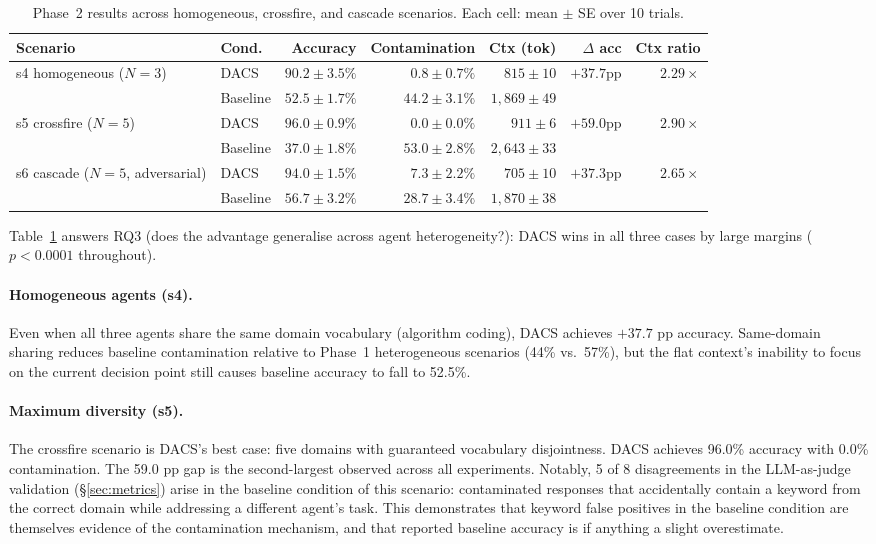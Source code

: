 \documentclass{article}
\begin{document}
\begin{table}[t]
\caption{Phase~2 results across homogeneous, crossfire, and cascade
scenarios.
Each cell: mean $\pm$ SE over 10 trials.}
\label{tab:phase2}
\centering
\footnotesize
\setlength{\tabcolsep}{3pt}
\begin{tabular}{llrrrrr}
\toprule
Scenario & Cond. & Accuracy & Contamination & Ctx (tok) & $\Delta$ acc & Ctx ratio \\
\midrule
\multirow{2}{*}{s4 homogeneous ($N=3$)}
  & DACS     & $90.2\pm3.5\%$ & $0.8\pm0.7\%$  & $815\pm10$  & \multirow{2}{*}{$+37.7$pp} & \multirow{2}{*}{$2.29\times$} \\
  & Baseline & $52.5\pm1.7\%$ & $44.2\pm3.1\%$ & $1{,}869\pm49$ & & \\[4pt]
\multirow{2}{*}{s5 crossfire ($N=5$)}
  & DACS     & $96.0\pm0.9\%$ & $0.0\pm0.0\%$ & $911\pm6$   & \multirow{2}{*}{$+59.0$pp} & \multirow{2}{*}{$2.90\times$} \\
  & Baseline & $37.0\pm1.8\%$ & $53.0\pm2.8\%$ & $2{,}643\pm33$ & & \\[4pt]
\multirow{2}{*}{s6 cascade ($N=5$, adversarial)}
  & DACS     & $94.0\pm1.5\%$ & $7.3\pm2.2\%$  & $705\pm10$  & \multirow{2}{*}{$+37.3$pp} & \multirow{2}{*}{$2.65\times$} \\
  & Baseline & $56.7\pm3.2\%$ & $28.7\pm3.4\%$ & $1{,}870\pm38$ & & \\
\bottomrule
\end{tabular}
\end{table}

Table~\ref{tab:phase2} answers RQ3 (does the advantage generalise
across agent heterogeneity?): DACS wins in all three cases by large
margins ($p < 0.0001$ throughout).

\paragraph{Homogeneous agents (s4).}
Even when all three agents share the same domain vocabulary (algorithm
coding), DACS achieves $+37.7$ pp accuracy.
Same-domain sharing reduces baseline contamination relative to Phase~1
heterogeneous scenarios (44\% vs.\ 57\%), but the flat context's
inability to focus on the current decision point still causes baseline
accuracy to fall to 52.5\%.

\paragraph{Maximum diversity (s5).}
The crossfire scenario is DACS's best case: five domains with
guaranteed vocabulary disjointness.
DACS achieves 96.0\% accuracy with 0.0\% contamination.
The 59.0 pp gap is the second-largest observed across all experiments.
Notably, 5 of 8 disagreements in the LLM-as-judge validation
(\S\ref{sec:metrics}) arise in the baseline condition of this
scenario: contaminated responses that accidentally contain a keyword
from the correct domain while addressing a different agent's task.
This demonstrates that keyword false positives in the baseline
condition are themselves evidence of the contamination mechanism, and
that reported baseline accuracy is if anything a slight overestimate.
\end{document}
